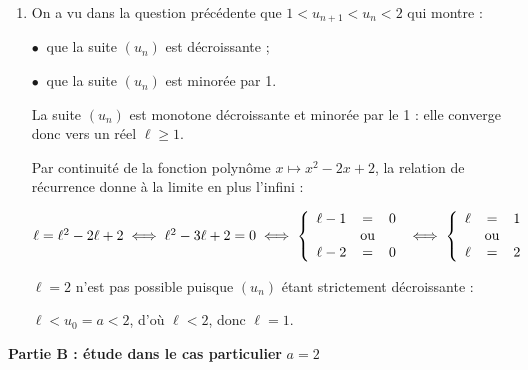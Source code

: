 \begin{enumerate}
\begin{enumerate}
		\emph{Hérédité} : soit $n \in \N$ tel que $u_n < 2$.

$u_n < 2 \iff u_n - 2 < 0$ et on a admis que $u_n > 1 \iff u_n - 1 > 0$, donc d'après le \textbf{1 b.} 	$\left(u_n - 1\right)\left(u_n - 2\right) < 0$ c'est-à-dire $u_{n+1} - u_n  < 0\iff u_{n+1} < u_n < 2$, d'où par transitivité : $u_{n+1} < 2$ : l'inégalité est vraie au rang $n + 1$.

\emph{Conclusion} : l'inégalité est vraie au rang 0 et si elle est vraie au rang $n$, elle l'est aussi au rang $n + 1$, donc par le principe de récurrence :

pour tout naturel $n \in \N, \:\: 1< u_n < 2$.
		\item %
On a vu dans la question précédente que $1 < u_{n+1} < u_n < 2$ qui montre :
		
		$\bullet~$ que la suite $\left(u_n\right)$ est décroissante ;
		
		$\bullet~$ que la suite $\left(u_n\right)$ est minorée par 1.
		
		La suite  $\left(u_n\right)$ est monotone décroissante et minorée par le 1 : elle converge donc vers un réel $\ell \geqslant 1$.
		
		Par continuité de la fonction polynôme $x \longmapsto x^2 - 2x + 2$, la relation de récurrence donne à la limite en plus l'infini :
		
		$\ell = \ell^2 - 2\ell + 2 \iff \ell^2 - 3\ell + 2  = 0 \iff \left\{\begin{array}{l c l}
\ell - 1&=&0\\
&\text{ou}&\\
\ell - 2&=&0\\
\end{array}\right. \iff \left\{\begin{array}{l c l}
\ell &=&1\\
&\text{ou}&\\
\ell &=&2\\
\end{array}\right. $

$\ell = 2$ n'est pas possible puisque $\left(u_n\right)$ étant strictement décroissante : 

$\ell < u_0 = a < 2$, d'où $\ell < 2$, \:donc $\ell = 1$.
	\end{enumerate}
\end{enumerate}
	
	\bigskip
	
\textbf{Partie B : étude dans le cas particulier }\boldmath $a = 2$\unboldmath

